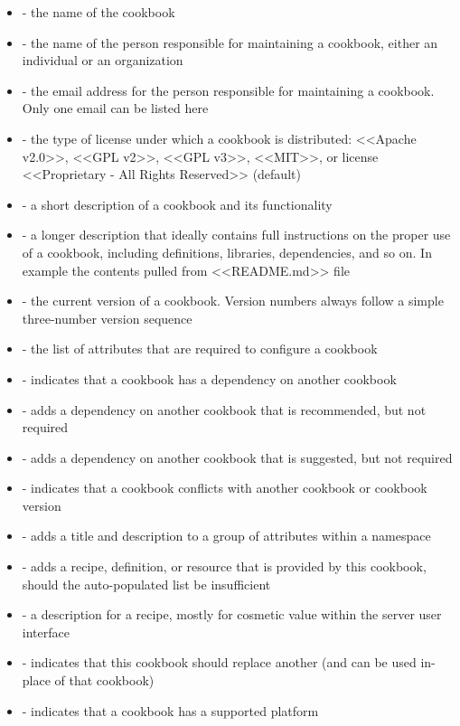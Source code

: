 \begin{itemize}
  \item {} - the name of the cookbook
  \item {} - the name of the person responsible for maintaining a cookbook, either an individual or an organization
  \item {} - the email address for the person responsible for maintaining a cookbook. Only one email can be listed here
  \item {} - the type of license under which a cookbook is distributed: <<Apache v2.0>>, <<GPL v2>>, <<GPL v3>>, <<MIT>>, or license <<Proprietary - All Rights Reserved>> (default)
  \item {} - a short description of a cookbook and its functionality
  \item {} - a longer description that ideally contains full instructions on the proper use of a cookbook, including definitions, libraries, dependencies, and so on. In example the contents pulled from <<README.md>> file
  \item {} - the current version of a cookbook. Version numbers always follow a simple three-number version sequence
  \item {} - the list of attributes that are required to configure a cookbook
  \item {} - indicates that a cookbook has a dependency on another cookbook
  \item {} - adds a dependency on another cookbook that is recommended, but not required
  \item {} - adds a dependency on another cookbook that is suggested, but not required
  \item {} - indicates that a cookbook conflicts with another cookbook or cookbook version
  \item {} - adds a title and description to a group of attributes within a namespace
  \item {} - adds a recipe, definition, or resource that is provided by this cookbook, should the auto-populated list be insufficient
  \item {} - a description for a recipe, mostly for cosmetic value within the server user interface
  \item {} - indicates that this cookbook should replace another (and can be used in-place of that cookbook)
  \item {} - indicates that a cookbook has a supported platform
\end{itemize}

